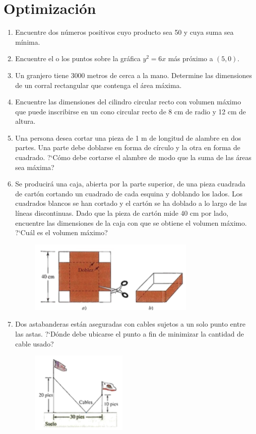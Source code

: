 \documentclass[11pt,a4paper,oneside]{article}\usepackage[]{graphicx}\usepackage[]{color}
\begin{document}
\section{Optimización}

\begin{enumerate}
      \item Encuentre dos números positivos cuyo producto sea 50 y cuya suma sea mínima.
      \item Encuentre el o los puntos sobre la gráfica $y^2=6x$ más próximo a $(5,0)$.
      \item Un granjero tiene 3000 metros de cerca a la mano. Determine las dimensiones de un corral rectangular que contenga el área máxima.
      \item Encuentre las dimensiones del cilindro circular recto con volumen máximo que puede inscribirse en un cono circular recto de 8 cm de radio y 12 cm de altura.
      \item Una persona desea cortar una pieza de 1 m de longitud de alambre en dos partes. Una parte debe doblarse en forma de círculo y la otra en forma de cuadrado. ?`Cómo debe cortarse el alambre de modo que la suma de las áreas sea máxima?
      \item Se producirá una caja, abierta por la parte superior, de una pieza cuadrada de cartón cortando un cuadrado de cada esquina y doblando los lados. Los cuadrados blancos se han cortado y el cartón se ha doblado a lo largo de las líneas discontinuas. Dado que la pieza de cartón mide 40 cm por lado, encuentre las dimensiones de la caja con que se obtiene el volumen máximo. ?`Cuál es el volumen máximo?
      
      \begin{figure}[H]
      \centering
      \includegraphics[scale=.7]{images/fig01.png}
      \end{figure}
      
      \item Dos astabanderas están aseguradas con cables sujetos a un solo punto entre las astas. ?`Dónde debe ubicarse el punto a fin de minimizar la cantidad de cable usado?
      
      \begin{figure}[H]
      \centering
      \includegraphics[scale=.7]{images/fig02.png}
      \end{figure}
      

\end{enumerate}
\end{document}
